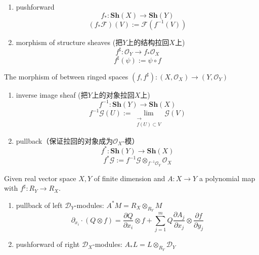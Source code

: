\documentclass[11pt]{article}
\theoremstyle{plain}
\theoremstyle{definition}
\theoremstyle{remark}
\newcommand{\Sh}{\mathbf{Sh}}
\begin{document}
\begin{enumerate}
    \item
          pushforward
          \begin{equation*}
              f_*: \Sh(X) \to \Sh(Y)
          \end{equation*}
          \begin{equation*}
              \left(f_*\mathcal{F}\right)(V):=\mathcal{F}(f^{-1}(V))
          \end{equation*}
    \item
          morphism of structure sheaves (把$Y$上的结构拉回$X$上)
          \begin{equation*}
              f^{\sharp}:\mathcal{O}_Y\to f_*\mathcal{O}_X
          \end{equation*}
          \begin{equation*}
              f^{\sharp}(\psi):=\psi \circ f
          \end{equation*}
\end{enumerate}
The morphism of between ringed spaces $\left(f,f^{\sharp}\right): \left(X,\mathcal{O}_X\right) \to \left(Y,\mathcal{O}_Y\right)$
\begin{enumerate}[resume]
    \item
          inverse image sheaf (把$Y$上的对象拉回$X$上)
          \begin{equation*}
              f^{-1}:\Sh(Y)\to \Sh(X)
          \end{equation*}
          \begin{equation*}
              f^{-1}\mathcal{G}(U):=\lim_{\substack{\longrightarrow\\f(U)\subset V}} \mathcal{G}(V)
          \end{equation*}

    \item
          pullback（保证拉回的对象成为$\mathcal{O}_X$-模）
          \begin{equation*}
              f^*:\Sh(Y)\to \Sh(X)
          \end{equation*}
          \begin{equation*}
              f^*\mathcal{G}:=f^{-1}\mathcal{G}\otimes_{f^{-1}\mathcal{O}_Y}\mathcal{O}_X
          \end{equation*}
\end{enumerate}

Given real vector space $X,Y$ of finite dimension and $A:X \to Y$ a polynomial map with $f^\sharp : R_Y \to R_X$.
\begin{enumerate}
    \item pullback of left $\mathcal{D}_Y$-modules: $A^* M =R_X \otimes_{R_Y} M $
          \begin{equation*}
              \partial_{x_i} \cdot (Q \otimes f) = \frac{\partial Q}{\partial x_i} \otimes f + \sum_{j=1}^m Q \frac{\partial A_j}{\partial x_j}\otimes \frac{\partial f}{\partial y_j}
          \end{equation*}
    \item pushforward of right $\mathcal{D}_X$-modules: $A_* L = L\otimes_{R_Y}  \mathcal{D}_Y $
\end{enumerate}
\end{document}
